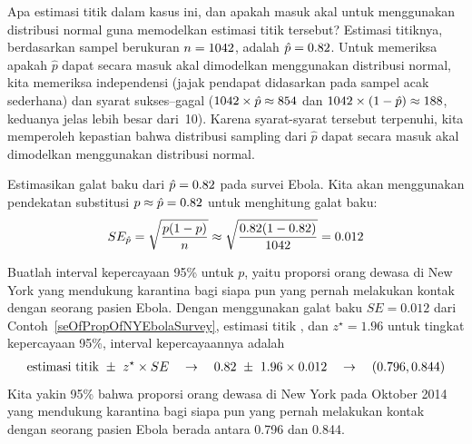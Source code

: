 \begin{examplewrap}
\begin{nexample}{Apa estimasi titik dalam kasus ini,
    dan apakah masuk akal untuk
    menggunakan distribusi normal guna memodelkan estimasi titik tersebut?}
  Estimasi titiknya, berdasarkan sampel berukuran $n = 1042{}$,
  adalah $\hat{p} = 0.82{}$.
  Untuk memeriksa apakah $\hat{p}$ dapat secara masuk akal
  dimodelkan menggunakan distribusi normal, kita memeriksa independensi
  (jajak pendapat didasarkan pada sampel acak sederhana) dan
  syarat sukses--gagal
  ($1042{} \times \hat{p} \approx 854{}$
  dan $1042{} \times (1 - \hat{p})
      \approx 188{}$,
  keduanya jelas lebih besar dari~10).
  Karena syarat-syarat tersebut terpenuhi, kita memperoleh kepastian
  bahwa distribusi sampling dari $\hat{p}$ dapat secara
  masuk akal dimodelkan menggunakan distribusi normal.
\end{nexample}
\end{examplewrap}

\begin{examplewrap}
\begin{nexample}{Estimasikan galat baku dari
    $\hat{p} = 0.82{}$ pada survei Ebola.}
  \label{seOfPropOfNYEbolaSurvey}%
  Kita akan menggunakan pendekatan substitusi
  $p \approx \hat{p} = 0.82{}$ untuk menghitung
  galat baku:
  \begin{align*}
  SE_{\hat{p}}
    = \sqrt{\frac{p(1-p)}{n}}
    \approx \sqrt{\frac{0.82{}
        (1 - 0.82{})}{1042{}}}
    = 0.012{}
  \end{align*}
\end{nexample}
\end{examplewrap}

\begin{examplewrap}
\begin{nexample}{Buatlah interval kepercayaan 95\% untuk $p$,
    yaitu proporsi orang dewasa di New York yang mendukung karantina
    bagi siapa pun yang pernah melakukan kontak dengan seorang pasien Ebola.}
  \label{ex_ci_ny_ebola_quarantine}%
  Dengan menggunakan galat baku $SE = 0.012$ dari
  Contoh~\ref{seOfPropOfNYEbolaSurvey},
  estimasi titik \wsjebolapollprop{}, dan $z^{\star} = 1.96$
  untuk tingkat kepercayaan 95\%, interval kepercayaannya adalah
  \begin{eqnarray*}
  \text{estimasi titik} \ \pm\ z^{\star} \times SE
    \quad\to\quad 0.82{} \ \pm\ 1.96\times 0.012{}
    \quad\to\quad (0.796, 0.844)
  \end{eqnarray*}
  Kita yakin 95\% bahwa proporsi orang dewasa di New York
  pada Oktober 2014 yang mendukung karantina bagi siapa pun yang pernah
  melakukan kontak dengan seorang pasien Ebola berada antara 0.796 dan 0.844.
\end{nexample}
\end{examplewrap}

